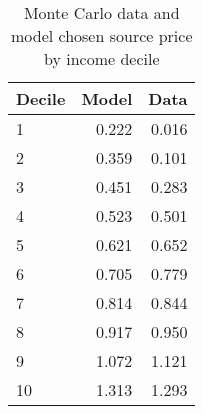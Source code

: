 \begin{table}[!ht]
	\centering
		\caption{Monte Carlo data and model chosen source price by income decile}
\begin{tabular}{lrr}
		\toprule
         Decile&     Model&      Data\\
		\midrule
		              1&     0.222&     0.016\\
		              2&     0.359&     0.101\\
		              3&     0.451&     0.283\\
		              4&     0.523&     0.501\\
		              5&     0.621&     0.652\\
		              6&     0.705&     0.779\\
		              7&     0.814&     0.844\\
		              8&     0.917&     0.950\\
		              9&     1.072&     1.121\\
		             10&     1.313&     1.293\\
		\bottomrule
	\end{tabular}
\end{table}
